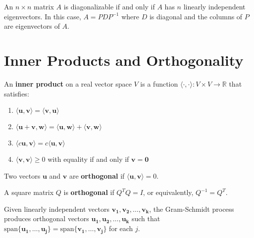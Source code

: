 \begin{theorem}[Diagonalization]
An $n \times n$ matrix $A$ is diagonalizable if and only if $A$ has $n$ linearly independent eigenvectors. In this case, $A = PDP^{-1}$ where $D$ is diagonal and the columns of $P$ are eigenvectors of $A$.
\end{theorem}

\section{Inner Products and Orthogonality}

\begin{definition}
An \textbf{inner product} on a real vector space $V$ is a function $\langle \cdot, \cdot \rangle : V \times V \to \mathbb{R}$ that satisfies:
\begin{enumerate}
    \item $\langle \mathbf{u}, \mathbf{v} \rangle = \langle \mathbf{v}, \mathbf{u} \rangle$
    \item $\langle \mathbf{u} + \mathbf{v}, \mathbf{w} \rangle = \langle \mathbf{u}, \mathbf{w} \rangle + \langle \mathbf{v}, \mathbf{w} \rangle$
    \item $\langle c\mathbf{u}, \mathbf{v} \rangle = c\langle \mathbf{u}, \mathbf{v} \rangle$
    \item $\langle \mathbf{v}, \mathbf{v} \rangle \geq 0$ with equality if and only if $\mathbf{v} = \mathbf{0}$
\end{enumerate}
\end{definition}

\begin{definition}
Two vectors $\mathbf{u}$ and $\mathbf{v}$ are \textbf{orthogonal} if $\langle \mathbf{u}, \mathbf{v} \rangle = 0$.
\end{definition}

\begin{definition}
A square matrix $Q$ is \textbf{orthogonal} if $Q^TQ = I$, or equivalently, $Q^{-1} = Q^T$.
\end{definition}

\begin{theorem}
Given linearly independent vectors $\mathbf{v_1}, \mathbf{v_2}, \ldots, \mathbf{v_k}$, the Gram-Schmidt process produces orthogonal vectors $\mathbf{u_1}, \mathbf{u_2}, \ldots, \mathbf{u_k}$ such that $\text{span}\{\mathbf{u_1}, \ldots, \mathbf{u_j}\} = \text{span}\{\mathbf{v_1}, \ldots, \mathbf{v_j}\}$ for each $j$.
\end{theorem}


